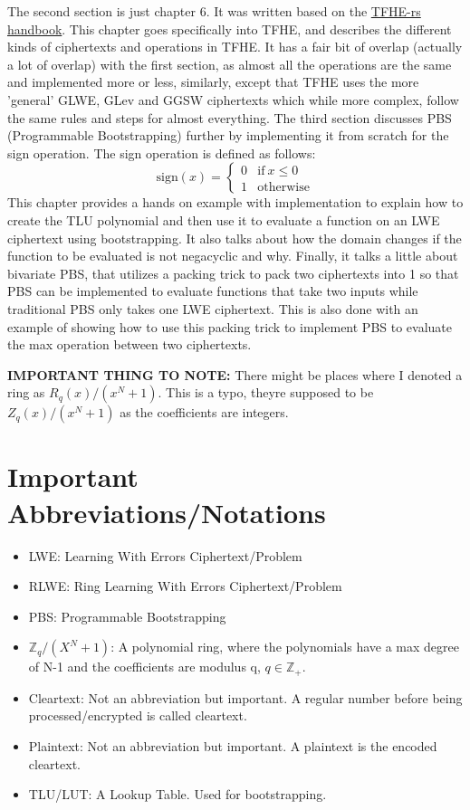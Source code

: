 \documentclass{report}
\begin{document}
The second section is just chapter 6. It was written based on the \hyperref[ref:handbook]{TFHE-rs handbook}. This chapter goes specifically into TFHE, and describes the different kinds of ciphertexts and operations in TFHE. It has a fair bit of overlap (actually a lot of overlap) with the first section, as almost all the operations are the same and implemented more or less, similarly, except that TFHE uses the more 'general' GLWE, GLev and GGSW ciphertexts which while more complex, follow the same rules and steps for almost everything.\newline
\newline
The third section discusses PBS (Programmable Bootstrapping) further by implementing it from scratch for the sign operation. The sign operation is defined as follows:
\begin{equation}
	\text{sign}(x) = 
	\begin{cases}
		0 & \text{if} \ x \leq 0\\
		1 &  \text{otherwise}
	\end{cases}
\end{equation}
This chapter provides a hands on example with implementation to explain how to create the TLU polynomial and then use it to evaluate a function on an LWE ciphertext using bootstrapping. It also talks about how the domain changes if the function to be evaluated is not negacyclic and why. Finally, it talks a little about bivariate PBS, that utilizes a packing trick to pack two ciphertexts into 1 so that PBS can be implemented to evaluate functions that take two inputs while traditional PBS only takes one LWE ciphertext. This is also done with an example of showing how to use this packing trick to implement PBS to evaluate the max operation between two ciphertexts.\newline

\textbf{IMPORTANT THING TO NOTE:} There might be places where I denoted a ring as $R_q(x)/ (x^N + 1)$. This is a typo, theyre supposed to be $Z_q(x)/ (x^N + 1)$ as the coefficients are integers.

\section{Important Abbreviations/Notations}
\begin{itemize}
	\item LWE: Learning With Errors Ciphertext/Problem
	\item RLWE: Ring Learning With Errors Ciphertext/Problem
	\item  PBS: Programmable Bootstrapping
	\item $\mathbb{Z}_q/(X^N + 1)$: A polynomial ring, where the polynomials have a max degree of N-1 and the coefficients are modulus q, $q \in \mathbb{Z}_+$. 
	\item Cleartext: Not an abbreviation but important. A regular number before being processed/encrypted is called cleartext.
	\item Plaintext: Not an abbreviation but important. A plaintext is the encoded cleartext.
	\item  TLU/LUT: A Lookup Table. Used for bootstrapping.
\end{itemize}
\end{document}
